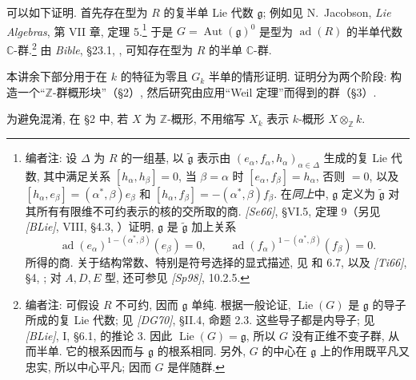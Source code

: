 可以如下证明. 首先存在型为 \(R\) 的复半单 Lie 代数 \(\mathfrak g\); 例如见 N.~Jacobson, \textit{Lie Algebras}, 第 VII 章, 定理 5.\footnote{编者注: 设 \(\Delta\) 为 \(R\) 的一组基, 以 \(\widetilde{\mathfrak g}\) 表示由 \((e_\alpha,f_\alpha,h_\alpha)_{\alpha\in\Delta}\) 生成的复 Lie 代数, 其中满足关系 \([h_\alpha,h_\beta]=0\), 当 \(\beta=\alpha\) 时 \([e_\alpha,f_\beta]=h_\alpha\), 否则 \(=0\), 以及 \([h_\alpha,e_\beta]=(\alpha^\ast,\beta)e_\beta\) 和 \([h_\alpha,f_\beta]=-(\alpha^\ast,\beta)f_\beta\).
在\emph{同上}中, \(\mathfrak g\) 定义为 \(\widetilde{\mathfrak g}\) 对其所有有限维不可约表示的核的交所取的商. \emph{[Se66]}, \S VI.5, 定理 9（另见 \emph{[BLie]}, VIII, \S4.3, ）证明, \(\mathfrak g\) 是 \(\widetilde{\mathfrak g}\) 加上关系
\[
 \operatorname{ad}(e_\alpha)^{1-(\alpha^\ast,\beta)}(e_\beta)=0,\qquad
 \operatorname{ad}(f_\alpha)^{1-(\alpha^\ast,\beta)}(f_\beta)=0.
\]
所得的商. 关于结构常数、特别是符号选择的显式描述, 见 和 6.7, 以及 \emph{[Ti66]}, \S4, ; 对 \(A,D,E\) 型, 还可参见 \emph{[Sp98]}, 10.2.5.}
于是 \(G=\operatorname{Aut}(\mathfrak g)^0\) 是型为 \(\operatorname{ad}(R)\) 的半单代数 \(\mathbb C\)-群.\footnote{编者注: 可假设 \(R\) 不可约, 因而 \(\mathfrak g\) 单纯. 根据一般论证, \(\operatorname{Lie}(G)\) 是 \(\mathfrak g\) 的导子所成的复 Lie 代数; 见 \emph{[DG70]}, \S II.4, 命题 2.3. 这些导子都是内导子; 见 \emph{[BLie]}, I, \S6.1,  的推论 3. 因此 \(\operatorname{Lie}(G)=\mathfrak g\), 所以 \(G\) 没有正维不变子群, 从而半单. 它的根系因而与 \(\mathfrak g\) 的根系相同. 另外, \(G\) 的中心在 \(\mathfrak g\) 上的作用既平凡又忠实, 所以中心平凡; 因而 \(G\) 是伴随群.}
由 \textit{Bible}, \S23.1, , 可知存在型为 \(R\) 的半单 \(\mathbb C\)-群.

本讲余下部分用于在 \(k\) 的特征为零且 \(G_k\) 半单的情形证明. 证明分为两个阶段: 构造一个“\(\mathbb Z\)-群概形块”（\S2）, 然后研究由应用“Weil 定理”而得到的群（\S3）.

为避免混淆, 在 \S2 中, 若 \(X\) 为 \(\mathbb Z\)-概形, 不用缩写 \(X_k\) 表示 \(k\)-概形 \(X\otimes_{\mathbb Z}k\).



